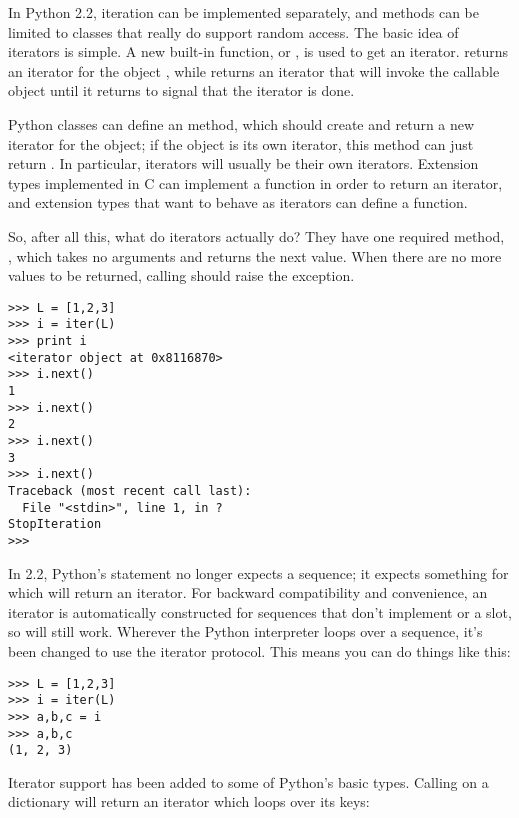 \documentclass{howto}
\begin{document}
In Python 2.2, iteration can be implemented separately, and
 methods can be limited to classes that really
do support random access.  The basic idea of iterators is 
simple.  A new built-in function,  or
, is used to get an iterator.
 returns an iterator for the object ,
while  returns an iterator that
will invoke the callable object  until it returns
 to signal that the iterator is done.  

Python classes can define an  method, which should
create and return a new iterator for the object; if the object is its
own iterator, this method can just return .  In particular,
iterators will usually be their own iterators.  Extension types
implemented in C can implement a  function in order to
return an iterator, and extension types that want to behave as
iterators can define a  function.

So, after all this, what do iterators actually do?  They have one
required method, , which takes no arguments and returns
the next value.  When there are no more values to be returned, calling
 should raise the  exception.

\begin{verbatim}
>>> L = [1,2,3]
>>> i = iter(L)
>>> print i
<iterator object at 0x8116870>
>>> i.next()
1
>>> i.next()
2
>>> i.next()
3
>>> i.next()
Traceback (most recent call last):
  File "<stdin>", line 1, in ?
StopIteration
>>>      
\end{verbatim}

In 2.2, Python's  statement no longer expects a sequence;
it expects something for which  will return an iterator.
For backward compatibility and convenience, an iterator is
automatically constructed for sequences that don't implement
 or a  slot, so  will still work.  Wherever the Python interpreter loops over
a sequence, it's been changed to use the iterator protocol.  This
means you can do things like this:

\begin{verbatim}
>>> L = [1,2,3]
>>> i = iter(L)
>>> a,b,c = i
>>> a,b,c
(1, 2, 3)
\end{verbatim}

Iterator support has been added to some of Python's basic types.  
Calling  on a dictionary will return an iterator
which loops over its keys:
\end{document}
